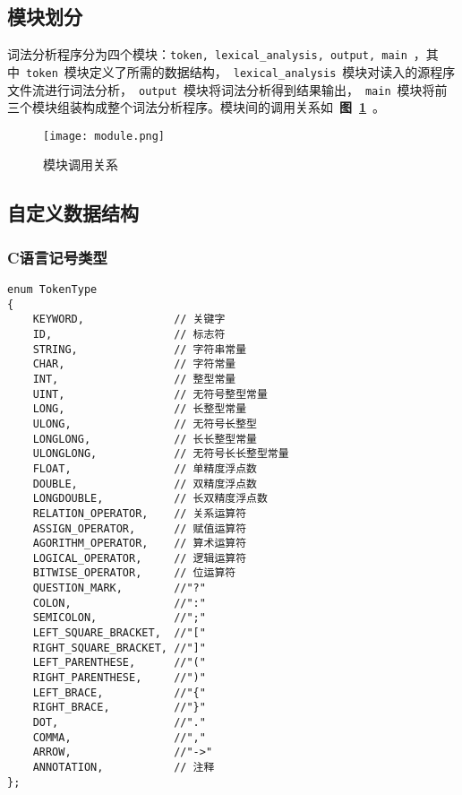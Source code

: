 \documentclass[lang=cn,11pt,a4paper]{paper}
\begin{document}
\subsection{模块划分}

词法分析程序分为四个模块：\lstinline{token, lexical_analysis, output, main}\ ，其中\ \lstinline{token}\ 模块定义了所需的数据结构，\ \lstinline{lexical_analysis}\ 模块对读入的源程序文件流进行词法分析，\ \lstinline{output}\ 模块将词法分析得到结果输出，\ \lstinline{main}\ 模块将前三个模块组装构成整个词法分析程序。模块间的调用关系如\ \textbf{图\ \ref{fig:模块调用关系}}\ 。

\begin{figure}[!htb]
    \centering
    \texttt{[image: module.png]}
    \caption{模块调用关系}
    \label{fig:模块调用关系}
\end{figure}

\subsection{自定义数据结构}

\subsubsection{C语言记号类型}

\begin{lstlisting}
enum TokenType
{
    KEYWORD,              // 关键字
    ID,                   // 标志符
    STRING,               // 字符串常量
    CHAR,                 // 字符常量
    INT,                  // 整型常量
    UINT,                 // 无符号整型常量
    LONG,                 // 长整型常量
    ULONG,                // 无符号长整型
    LONGLONG,             // 长长整型常量
    ULONGLONG,            // 无符号长长整型常量
    FLOAT,                // 单精度浮点数
    DOUBLE,               // 双精度浮点数
    LONGDOUBLE,           // 长双精度浮点数
    RELATION_OPERATOR,    // 关系运算符
    ASSIGN_OPERATOR,      // 赋值运算符
    AGORITHM_OPERATOR,    // 算术运算符
    LOGICAL_OPERATOR,     // 逻辑运算符
    BITWISE_OPERATOR,     // 位运算符
    QUESTION_MARK,        //"?"
    COLON,                //":"
    SEMICOLON,            //";"
    LEFT_SQUARE_BRACKET,  //"["
    RIGHT_SQUARE_BRACKET, //"]"
    LEFT_PARENTHESE,      //"("
    RIGHT_PARENTHESE,     //")"
    LEFT_BRACE,           //"{"
    RIGHT_BRACE,          //"}"
    DOT,                  //"."
    COMMA,                //","
    ARROW,                //"->"
    ANNOTATION,           // 注释
};
\end{lstlisting}
\end{document}
